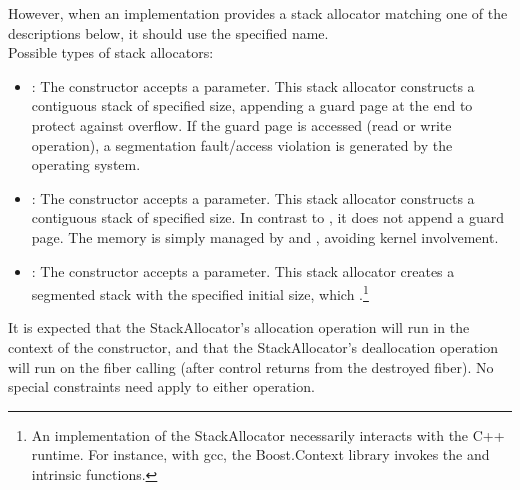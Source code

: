 However, when an implementation provides a stack allocator matching one of
the descriptions below, it should use the specified name.\\

Possible types of stack allocators:
\begin{itemize}
    \item {}: The constructor accepts a 
          parameter. This stack allocator constructs a contiguous stack of
          specified size, appending a guard page at the end to protect against
          overflow. If the guard page is accessed (read or write operation), a
          segmentation fault/access violation is generated by the operating
          system.
    \item {}: The constructor accepts a  parameter.
          This stack allocator constructs a contiguous stack of specified size.
          In contrast to , it does not append a guard
          page. The memory is simply managed by 
          and , avoiding kernel involvement.
    \item {}: The constructor accepts a  parameter.
          This stack allocator creates a segmented stack\cite{gccsplit} with the
          specified initial size, which .\footnote{An
          implementation of the  StackAllocator necessarily
          interacts with the C++ runtime. For instance, with gcc, the
          Boost.Context\cite{bcontext} library invokes
          the 
          and  intrinsic
          functions.\cite{splitalloc}}
\end{itemize}

It is expected that the StackAllocator's allocation operation will run in the
context of the \fiber constructor, and that the StackAllocator's deallocation
operation will run on the fiber calling \dtor (after control returns from the
destroyed fiber). No special constraints need apply to either operation.

